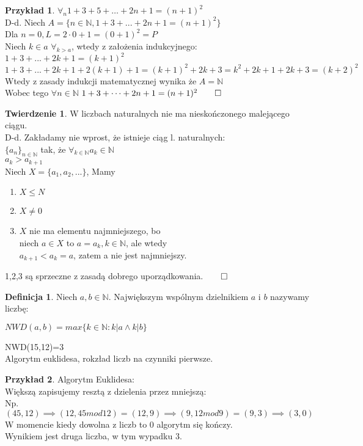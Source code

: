 \documentclass{article}
\theoremstyle{definition}
\newtheorem{de}{Definicja}[subsection]
\theoremstyle{definition}
\newtheorem{tw}{Twierdzenie}[subsection]
\theoremstyle{definition}
\newtheorem{pk}{Przykład}[subsection]
\theoremstyle{definition}
\begin{document}
\begin{pk}
    $\forall_n 1+3+5+\dots+2n+1=(n+1)^2$\\
    D-d. Niech $A=\{n\in\mathbb{N}, 1+3+...+2n+1=(n+1)^2\}$\\
    Dla $n=0, L=2\cdot0+1=(0+1)^2=P$\\
    Niech $k\in a$ $\forall_{k>a}$, wtedy z założenia indukcyjnego:\\
    $1+3+...+2k+1=(k+1)^2$\\
    $1+3+...+2k+1+2(k+1)+1=(k+1)^2+2k+3=k^2+2k+1+2k+3=(k+2)^2$\\
    Wtedy z zasady indukcji matematycznej wynika że $A=\mathbb{N}$\\
    Wobec tego $\forall{n\in\mathbb{N}}$ $1+3+\dots+2n+1=(n+1)^2\qed$
\end{pk}

\begin{tw}
    W liczbach naturalnych nie ma nieskończonego malejącego ciągu.\\
    D-d. Zakładamy nie wprost, że istnieje ciąg l. naturalnych:\\
    $\{a_n\}_{n\in \mathbb{N}}$ tak, że $\forall_{k\in\mathbb{N}} a_k\in\mathbb{N}$\\
    $a_k>a_{k+1}$\\
    Niech $X=\{a_1,a_2,...\}$, Mamy 
    \begin{enumerate}
        \item $X\leq N$
        \item $X\neq 0$
        \item $X$ nie ma elementu najmniejszego, bo\\
        niech $a\in X$ to $a=a_k, k\in\mathbb{N}$, ale wtedy\\
        $a_{k+1}<a_k=a$, zatem a nie jest najmniejszy. 
    \end{enumerate}
    1,2,3 są sprzeczne z zasadą dobrego uporządkowania.$\qed$
\end{tw}

\begin{de}
    Niech $a,b\in \mathbb{N}$. Największym wspólnym dzielnikiem $a$ i $b$ nazywamy liczbę:
    \begin{center}
        $NWD(a,b)=max\{k\in\mathbb{N} : k|a \land k|b\}$
    \end{center}
    NWD(15,12)=3\\
    Algorytm euklidesa, rokzład liczb na czynniki pierwsze.
\end{de}

\begin{pk}
    Algorytm Euklidesa:\\
    Większą zapisujemy resztą z dzielenia przez mniejszą:\\
    Np. $(45,12)\implies(12, 45 mod 12)=(12,9)\implies(9,12 mod 9)=(9,3)\implies(3,0)$\\
    W momencie kiedy dowolna z liczb to $0$ algorytm się kończy.\\
    Wynikiem jest druga liczba, w tym wypadku $3$.
\end{pk}
\end{document}
